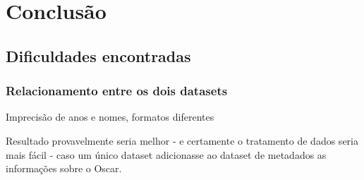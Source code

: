 \chapter[Conclusão]{Conclusão}

    \section[Dificuldades encontradas]{Dificuldades encontradas}

        \subsection{Relacionamento entre os dois datasets}
        
        Imprecisão de anos e nomes, formatos diferentes
        
        Resultado provavelmente seria melhor - e certamente o tratamento de dados seria mais fácil - caso um único dataset adicionasse ao dataset de metadados as informações sobre o Oscar.

